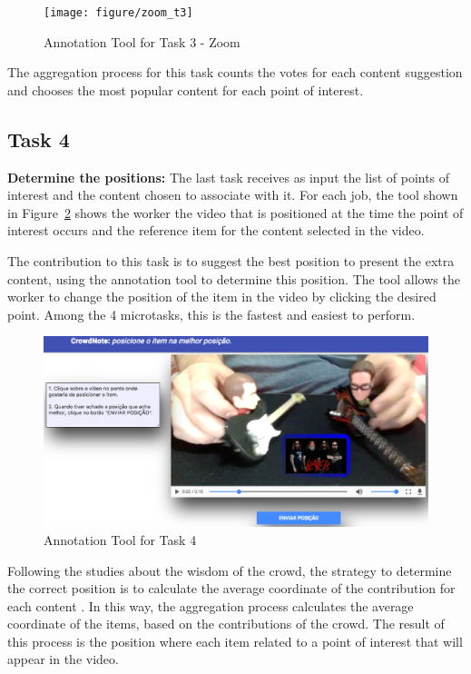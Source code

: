 \begin{figure}[h!]
	\centerline{\texttt{[image: figure/zoom\_t3]}}
	\caption{Annotation Tool for Task 3 - Zoom}
	\label{zoom_task_3}
\end{figure}

The aggregation process for this task counts the votes for each content suggestion and chooses the most popular content for each point of interest.



\subsection{Task 4}

\textbf{Determine the positions:} The last task receives as input the list of points of interest and the content chosen to associate with it. For each job, the tool shown in Figure~\ref{task_4} shows the worker the video that is positioned at the time the point of interest occurs and the reference item for the content selected in the video.

The contribution to this task is to suggest the best position to present the extra content, using the annotation tool to determine this position. The tool allows the worker to change the position of the item in the video by clicking the desired point. Among the 4 microtasks, this is the fastest and easiest to perform.

\begin{figure}[h!]
	\centerline{\includegraphics[scale=0.22] {figure/task_4}}
	\caption{Annotation Tool for Task 4}
	\label{task_4}
\end{figure}

Following the studies about the wisdom  of the crowd, the strategy to determine the correct position is to calculate the average coordinate of the contribution for each content \citep{GALTON1907}. In this way, the aggregation process calculates the average coordinate of the items, based on the contributions of the crowd. The result of this process is the position where each item related to a point of interest that will appear in the video.


